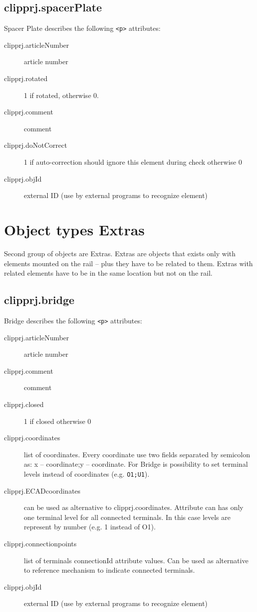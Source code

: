 \documentclass[%
	a4paper,
	oneside,
	listof=numbered,
	parskip=half,
	headsepline=true,
	footsepline=true,
	]{scrbook}
\begin{document}
\subsection{clipprj.spacerPlate}
 
Spacer Plate describes the following \verb|<p>| attributes: 

\begin{description}
	\item[clipprj.articleNumber] article number 
	\item[clipprj.rotated] 1 if rotated, otherwise 0. 
	\item[clipprj.comment] comment 
	\item[clipprj.doNotCorrect] 1 if auto-correction should ignore this element during check otherwise 0 
	\item[clipprj.objId] external ID (use by external programs to recognize element) 
\end{description}

\section{Object types \glqq{}Extras\grqq{}} 
 
Second group of objects are Extras. Extras are objects that exists only with elements mounted on the rail – plus they have to be related to them. Extras with related elements have to be in the same location but not on the rail. 

\subsection{clipprj.bridge}
 
Bridge describes the following \verb|<p>| attributes: 

\begin{description}
	\item[clipprj.articleNumber] article number 
	\item[clipprj.comment] comment 
	\item[clipprj.closed] 1 if closed otherwise 0 
	\item[clipprj.coordinates] list of coordinates. Every coordinate use two fields separated by semicolon as: x – coordinate;y – coordinate. For Bridge is possibility to set terminal levels instead of coordinates (e.g. \verb|O1;U1|). 
	\item[clipprj.ECADcoordinates] can be used as alternative to clipprj.coordinates. Attribute can has only one terminal level for all connected terminals. In this case levels are represent by number (e.g. 1 instead of O1). 
	\item[clipprj.connectionpoints] list of terminals connectionId attribute values. Can be used as alternative to reference mechanism to indicate connected terminals. 
	\item[clipprj.objId] external ID (use by external programs to recognize element) 
\end{description}
\end{document}
